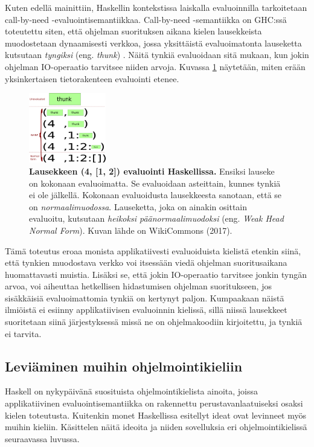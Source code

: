 Kuten edellä mainittiin, Haskellin kontekstissa laiskalla evaluoinnilla tarkoitetaan call-by-need -evaluointisemantiikkaa. Call-by-need -semantiikka on GHC:ssä toteutettu siten, että ohjelman suorituksen aikana kielen lausekkeista muodostetaan dynaamisesti verkkoa, jossa yksittäistä evaluoimatonta lauseketta kutsutaan \textit{tyngiksi} (eng. \textit{thunk}) \citep{hudak2007history}. Näitä tynkiä evaluoidaan sitä mukaan, kun jokin ohjelman IO-operaatio tarvitsee niiden arvoja. Kuvassa \ref{figure:thunk} näytetään, miten erään yksinkertaisen tietorakenteen evaluointi etenee.
\begin{figure}[h]
  \centering
    \includegraphics[width=0.3\textwidth]{figure-thunk-layers}
  \caption{\footnotesize\textbf{Lausekkeen (4, [1, 2]) evaluointi Haskellissa.} Ensiksi lauseke on kokonaan evaluoimatta. Se evaluoidaan asteittain, kunnes tynkiä ei ole jälkellä. Kokonaan evaluoidusta lausekkeesta sanotaan, että se on \textit{normaalimuodossa}. Lauseketta, joka on ainakin osittain evaluoitu, kutsutaan \textit{heikoksi päänormaalimuodoksi} (eng. \textit{Weak Head Normal Form}). Kuvan lähde on WikiCommons (2017).}
  \label{figure:thunk}
\end{figure}

Tämä toteutus eroaa monista applikatiivesti evaluoiduista kielistä etenkin siinä, että tynkien muodostava verkko voi itsessään viedä ohjelman suoritusaikana huomattavasti muistia. Lisäksi se, että jokin IO-operaatio tarvitsee jonkin tyngän arvoa, voi aiheuttaa hetkellisen hidastumisen ohjelman suoritukseen, jos sisäkkäisiä evaluoimattomia tynkiä on kertynyt paljon. Kumpaakaan näistä ilmiöistä ei esiinny applikatiivisen evaluoinnin kielissä, sillä niissä lausekkeet suoritetaan siinä järjestyksessä missä ne on ohjelmakoodiin kirjoitettu, ja tynkiä ei tarvita.


\subsection{Leviäminen muihin ohjelmointikieliin}

Haskell on nykypäivänä suosituista ohjelmointikielista ainoita, joissa applikatiivinen evaluointisemantiikka on rakennettu perustavanlaatuiseksi osaksi kielen toteutusta. Kuitenkin monet Haskellissa esitellyt ideat ovat levinneet myös muihin kieliin. Käsittelen näitä ideoita ja niiden sovelluksia eri ohjelmointikielissä seuraavassa luvussa.

